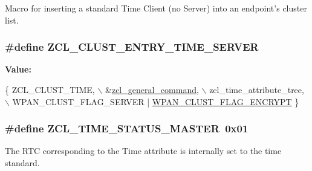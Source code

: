 Macro for inserting a standard Time Client (no Server) into an endpoint's cluster list. 

\hypertarget{group__zcl__time_ga452ea03450fe395765c348b1154d6cf9}{
\subsubsection[{Z\-C\-L\-\_\-\-C\-L\-U\-S\-T\-\_\-\-E\-N\-T\-R\-Y\-\_\-\-T\-I\-M\-E\-\_\-\-S\-E\-R\-V\-E\-R}]{\setlength{\rightskip}{0pt plus 5cm}\#define Z\-C\-L\-\_\-\-C\-L\-U\-S\-T\-\_\-\-E\-N\-T\-R\-Y\-\_\-\-T\-I\-M\-E\-\_\-\-S\-E\-R\-V\-E\-R}}\label{group__zcl__time_ga452ea03450fe395765c348b1154d6cf9}
{\bfseries Value\-:}
\begin{DoxyCode}
\{ ZCL\_CLUST\_TIME,                \(\backslash\)
         &\hyperlink{group__zcl_gac3849121e93e777ce9a7510d24517b9b}{zcl\_general\_command},                          \(\backslash\)
         zcl\_time\_attribute\_tree,      \(\backslash\)
         WPAN\_CLUST\_FLAG\_SERVER | \hyperlink{group__wpan__aps_ga1eafd87038a2134da7a1f72e6801d23b}{WPAN\_CLUST\_FLAG\_ENCRYPT}
       \}
\end{DoxyCode}
\hypertarget{group__zcl__time_gabf057b123b136f20ade3faf065dcb298}{
\subsubsection[{Z\-C\-L\-\_\-\-T\-I\-M\-E\-\_\-\-S\-T\-A\-T\-U\-S\-\_\-\-M\-A\-S\-T\-E\-R}]{\setlength{\rightskip}{0pt plus 5cm}\#define Z\-C\-L\-\_\-\-T\-I\-M\-E\-\_\-\-S\-T\-A\-T\-U\-S\-\_\-\-M\-A\-S\-T\-E\-R~0x01}}\label{group__zcl__time_gabf057b123b136f20ade3faf065dcb298}


The R\-T\-C corresponding to the Time attribute is internally set to the time standard. 

